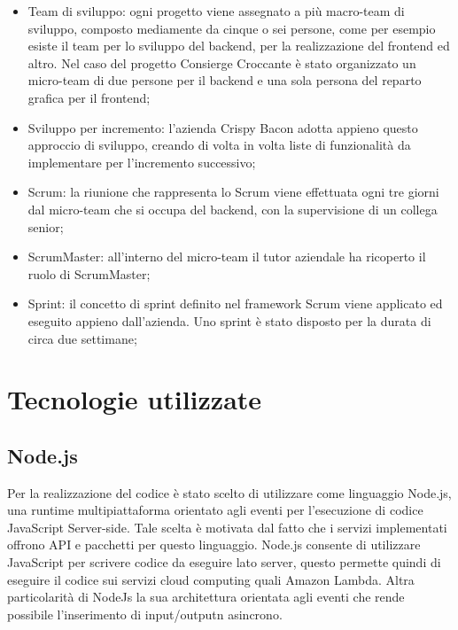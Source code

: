 \begin{itemize}
    \item Team di sviluppo: ogni progetto viene assegnato a più macro-team di sviluppo, composto mediamente da cinque o sei persone, come per esempio esiste il team per lo sviluppo del backend, per la realizzazione del frontend ed altro. Nel caso del progetto Consierge Croccante è stato organizzato un micro-team di due persone per il backend e una sola persona del reparto grafica per il frontend;
    
    \item Sviluppo per incremento: l’azienda Crispy Bacon adotta appieno questo approccio di sviluppo, creando di volta in volta liste di funzionalità da implementare per l'incremento successivo;
    
    \item Scrum: la riunione che rappresenta lo Scrum viene effettuata ogni tre giorni dal micro-team che si occupa del backend, con la supervisione di un collega senior;
    
    \item ScrumMaster: all'interno del micro-team il tutor aziendale ha ricoperto il ruolo di ScrumMaster;
    
    \item Sprint: il concetto di sprint definito nel framework Scrum viene applicato ed eseguito appieno dall'azienda. Uno sprint è stato disposto per la durata di circa due settimane;
    
\end{itemize}

\section{Tecnologie utilizzate}
\subsection{Node.js}
\label{nodejs}
Per la realizzazione del codice è stato scelto di utilizzare come linguaggio Node.js, una runtime multipiattaforma orientato agli eventi per l'esecuzione di codice JavaScript Server-side. Tale scelta è motivata dal fatto che i servizi implementati offrono API e pacchetti per questo linguaggio. Node.js consente di utilizzare JavaScript per scrivere codice da eseguire lato server, questo permette quindi di eseguire il codice sui servizi cloud computing quali Amazon Lambda. Altra particolarità di NodeJs la sua architettura orientata agli eventi che rende possibile l’inserimento di input/outputn asincrono. 

